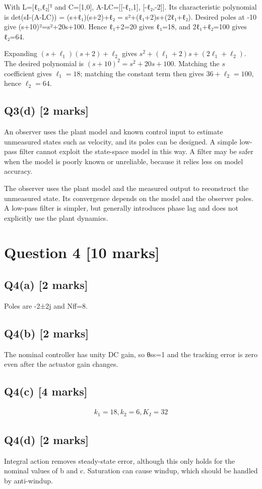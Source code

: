 \documentclass[11pt,a4paper]{article}
\begin{document}
With L=[ℓ₁,ℓ₂]ᵀ and C=[1,0], A-LC=[[-ℓ₁,1], [-ℓ₂,-2]].
Its characteristic polynomial is det(sI-(A-LC)) = (s+ℓ₁)(s+2)+ℓ₂ = s²+(ℓ₁+2)s+(2ℓ₁+ℓ₂).
Desired poles at -10 give (s+10)²=s²+20s+100.
Hence ℓ₁+2=20 gives ℓ₁=18, and 2ℓ₁+ℓ₂=100 gives ℓ₂=64.\par\smallskip Expanding $(s+\ell_1)(s+2)+\ell_2$ gives $s^2+(\ell_1+2)s+(2\ell_1+\ell_2)$. The desired polynomial is $(s+10)^2=s^2+20s+100$. Matching the $s$ coefficient gives $\ell_1=18$; matching the constant term then gives $36+\ell_2=100$, hence $\ell_2=64$.

\subsection*{Q3(d) \hfill [2 marks]}

An observer uses the plant model and known control input to estimate unmeasured states such as velocity, and its poles can be designed.
A simple low-pass filter cannot exploit the state-space model in this way.
A filter may be safer when the model is poorly known or unreliable, because it relies less on model accuracy.\par\smallskip The observer uses the plant model and the measured output to reconstruct the unmeasured state. Its convergence depends on the model and the observer poles. A low-pass filter is simpler, but generally introduces phase lag and does not explicitly use the plant dynamics.

\section*{Question 4 \hfill [10 marks]}
\subsection*{Q4(a) \hfill [2 marks]}

Poles are -2±2j and Nff=8.

\subsection*{Q4(b) \hfill [2 marks]}

The nominal controller has unity DC gain, so θss=1 and the tracking error is zero even after the actuator gain changes.

\subsection*{Q4(c) \hfill [4 marks]}

\[\begin{aligned}k_1=18, k_2=6, K_I=32\end{aligned}\]

\subsection*{Q4(d) \hfill [2 marks]}

Integral action removes steady-state error, although this only holds for the nominal values of b and c.
Saturation can cause windup, which should be handled by anti-windup.
\end{document}
